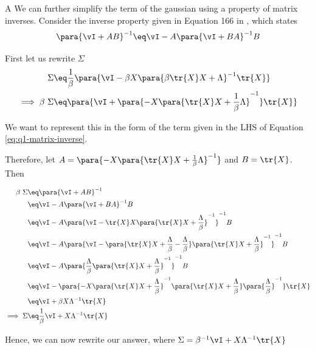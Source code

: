 \documentclass{article}
\begin{document}
\begin{question}
\begin{qpart}{A}
		We can further simplify the term of the gaussian using a property of matrix inverses.
		Consider the inverse property given in Equation 166 in \cite{matrix-cookbook}, which states
		\begin{equation}
			\para{\vI + AB}^{-1}	\eq	\vI - A \para{\vI + BA}^{-1} B
			\label{eq:q1-matrix-inverse}
		\end{equation}

		First let us rewrite $\Sigma$
		\begin{align*}
			\Sigma	&\eq	\frac{1}{\beta} \para{\vI - \beta X \para{\beta \tr{X} X + \Lambda}^{-1} \tr{X}} \\
			\implies \beta\ \Sigma	&\eq	\para{\vI + \para{- X \para{\tr{X} X + \frac{1}{\beta} \Lambda}^{-1}} \tr{X}}
		\end{align*}

		We want to represent this in the form of the term given in the LHS of Equation \ref{eq:q1-matrix-inverse}.

		Therefore, let $A = \para{- X \para{\tr{X} X + \frac{1}{\beta} \Lambda}^{-1}}$ and $B = \tr{X}$.
		Then

		\begin{align*}
			\beta\ \Sigma	&\eq	\para{\vI + AB}^{-1} \\
			&\eq	\vI - A \para{\vI + BA}^{-1} B \\
			&\eq	\vI - A \para{\vI - \tr{X} X \para{\tr{X} X + \frac{\Lambda}{\beta}}^{-1}}^{-1} B \\
			&\eq	\vI - A \para{\vI - \para{\tr{X} X + \frac{\Lambda}{\beta} - \frac{\Lambda}{\beta}} \para{\tr{X} X + \frac{\Lambda}{\beta}}^{-1}}^{-1} B \\
			&\eq	\vI - A \para{\frac{\Lambda}{\beta} \para{\tr{X} X + \frac{\Lambda}{\beta}}^{-1}}^{-1} B \\
			&\eq	\vI - \para{- X \para{\tr{X} X + \frac{\Lambda}{\beta}}^{-1} \para{\tr{X} X + \frac{\Lambda}{\beta}} \para{\frac{\Lambda}{\beta}}^{-1}} \tr{X} \\
			&\eq	\vI + \beta X \Lambda^{-1} \tr{X} \\
			\implies \Sigma	&\eq	\frac{1}{\beta} \vI + X \Lambda^{-1} \tr{X}
		\end{align*}

		Hence, we can now rewrite our answer,
		where $\Sigma = \beta^{-1} \vI + X \Lambda^{-1} \tr{X}$


\end{qpart}
\end{question}
\end{document}
